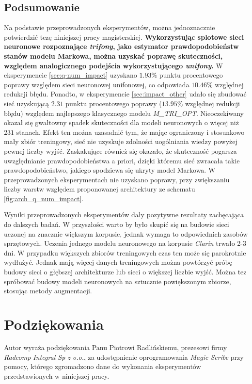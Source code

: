\documentclass[shortabstract, mgr]{iithesis}
\begin{document}
\section{ Podsumowanie }
	Na podstawie przeprowadzonych eksperymentów, można jednoznacznie potwierdzić tezę niniejszej pracy magisterskiej. \textbf{Wykorzystując splotowe sieci neuronowe rozpoznające \textit{trifony}, jako estymator prawdopodobieństw stanów modelu Markowa, można uzyskać poprawę skuteczności, względem analogicznego podejścia wykorzystującego \textit{unifony}.} W eksperymencie \ref{sec:q-num_impact} uzyskano $1.93\%$ punktu procentowego poprawy względem sieci neuronowej unifonowej, co odpowiada $10.46\%$ względnej redukcji błędu. Ponadto, w eksperymencie \ref{sec:impact_other} udało się zbudować sieć uzyskującą $2.31$ punktu procentowego poprawy ($13.95\%$ względnej redukcji błędu) względem najlepszego klasycznego modelu \textit{M\_TRI\_OPT}. Nieoczekiwany okazał się gwałtowny spadek skuteczności dla modeli neuronowych o więcej niż $231$ stanach. Efekt ten można uzasadnić tym, że mając ograniczony i stosunkowo mały zbiór treningowy, sieć nie uzyskuje zdolności uogólniania wiedzy powyżej pewnej liczby wyjść. Zaskakujące również się okazało, że skuteczność pogarsza uwzględnianie prawdopodobieństwa a priori, dzięki któremu sieć zwracała takie prawdopodobieństwo, jakiego spodziewa się ukryty model Markowa. W przeprowadzonych eksperymentach nie uzyskano poprawy, przy zwiększaniu liczby warstw względem proponowanej architektury ze schematu \ref{fig:arch_q_num_impact}.
	
	Wyniki przeprowadzonych eksperymentów dały pozytywne rezultaty zachęcająca do dalszych badań. W przyszłości warto by było skupić się na budowie sieci uczonej na znacznie większym korpusie, jednak wymaga to odpowiednich zasobów sprzętowych. Uczenia jednego modelu neuronowego na korpusie \textit{Clarin} trwało 2-3 dni. W przypadku większych zbiorów treningowych czas ten może się parokrotnie wydłużyć. Jednak mają więcej danych treningowych można powtórzyć próbę budowy sieci o głębszej architekturze lub sieci o większej liczbie wyjść. Można tez spróbować budowy modeli neuronowych na sztucznie powiększonym zbiorze, stosując metody augmentacji.
   
\chapter{Podziękowania}
	Autor wyraża podziękowania Panu Piotrowi Radlińskiemu, prezesowi firmy \textit{Radcomp Integral Sp z o.o.}, za udostępnienie oprogramowania \textit{Magic Scribe} przy pomocy, którego zgromadzono dane do wykonania eksperymentów przedstawionych w niniejszej pracy.
   
	
	
\end{document}
